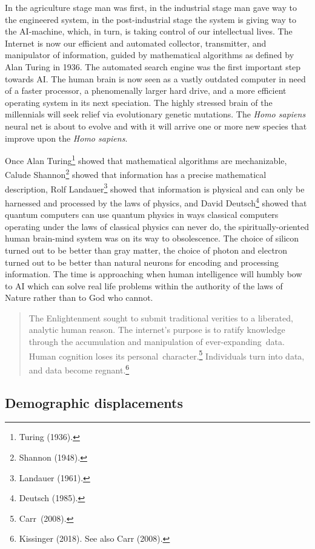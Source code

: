 \begin{multicols}{2}
In the agriculture stage man was first, in the industrial stage man gave way to the engineered system, in the post-industrial stage the system is giving way to the AI-machine, which, in turn, is taking control of our intellectual lives. The Internet is now our efficient and automated collector, transmitter, and manipulator of information, guided by mathematical algorithms as defined by Alan Turing in 1936. The automated search engine was the first important step towards AI. The human brain is now seen as a vastly outdated computer in need of a faster processor, a phenomenally larger hard drive, and a more efficient operating system in its next speciation. The highly stressed brain of the millennials will seek relief via evolutionary genetic mutations. The \textit{Homo sapiens} neural net is about to evolve and with it will arrive one or more new species that improve upon the \textit{Homo sapiens}.

Once Alan Turing\footnote{Turing (1936).} showed that mathematical algorithms are mechanizable, Calude Shannon\footnote{Shannon (1948).} showed that information has a precise mathematical description, Rolf Landauer\footnote{Landauer (1961).}  showed that information is physical and can only be harnessed and processed by the laws of physics, and David Deutsch\footnote{Deutsch (1985).}  showed that quantum computers can use quantum physics in ways classical computers operating under the laws of classical physics can never do, the spiritually-oriented human brain-mind system was on its way to obsolescence. The choice of silicon turned out to be better than gray matter, the choice of photon and electron turned out to be better than natural neurons for encoding and processing information. The time is approaching when human intelligence will humbly bow to AI which can solve real life problems within the authority of the laws of Nature rather than to God who cannot.
\begin{quote}
The Enlightenment sought to submit traditional verities to a liberated, analytic human reason. The internet's purpose is to ratify knowledge through the accumulation and manipulation of \hbox{ever-expanding data}. Human cognition loses its \hbox{personal character.\footnote{Carr (2008).}} Individuals turn into data, and data become regnant.\footnote{Kissinger (2018). See also Carr (2008).}
\end{quote}

\subsection{Demographic displacements}


\end{multicols}

